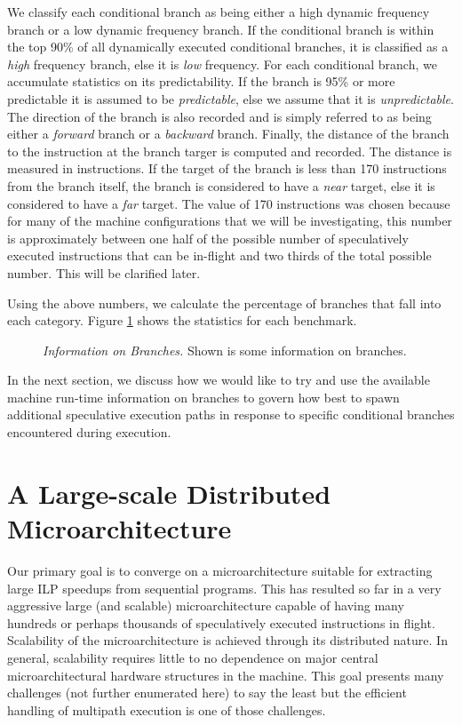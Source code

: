 \documentclass[10pt,dvips]{article}
\begin{document}
We classify each conditional branch as 
being either a high dynamic frequency branch
or a low dynamic frequency branch.  
If the conditional branch
is within the top 90\% of all dynamically executed conditional branches,
it is classified as a \textit{high} frequency branch, else it 
is \textit{low} frequency.
For each conditional branch, we accumulate statistics on
its predictability.  If the branch is 95\% or more predictable
it is assumed to be 
\textit{predictable}, else we assume that it is
\textit{unpredictable}.
The direction of the branch is also recorded and is simply
referred to as being either a 
\textit{forward} branch or a 
\textit{backward} branch.
Finally, the distance of the branch to 
the instruction at the
branch targer is computed and recorded.  The distance is measured
in instructions.  If the target of the branch is less than 170 instructions
from the branch itself, the branch is considered to have a 
\textit{near} target, else it is considered to have a
\textit{far} target.  The value of 170 instructions was chosen
because for many of the machine configurations that we will be
investigating, this number is approximately between one half of
the possible number of speculatively executed instructions
that can be in-flight and two thirds of the total possible number.
This will be clarified later.

Using the above numbers, we calculate the percentage of branches 
that fall into each category.  
Figure \ref{fig:bpdist} shows the statistics for each benchmark.  

\begin{figure}
\vspace{0.2 in}
\setlength{\epsfxsize}{10cm}%
\centerline{}
\caption{{\em Information on Branches.} 
Shown is some information on branches.}
\label{fig:bpdist}
\end{figure}

In the next section, we discuss how we would like to try and
use the available machine run-time information on branches to
govern how best to spawn additional speculative execution paths
in response to specific conditional branches encountered during execution.
%
\section{A Large-scale Distributed Microarchitecture}
%
Our primary goal is to converge on a microarchitecture suitable
for extracting large ILP speedups from sequential programs.
This has resulted so far in a very aggressive large (and scalable)
microarchitecture capable of having many hundreds or perhaps thousands
of speculatively executed instructions in flight.  Scalability
of the microarchitecture is achieved through its distributed nature.
In general, scalability requires little to no dependence on major
central microarchitectural hardware structures in the machine.
This goal presents many challenges (not further enumerated here)
to say the least but the efficient handling of multipath execution
is one of those challenges.  
\end{document}
